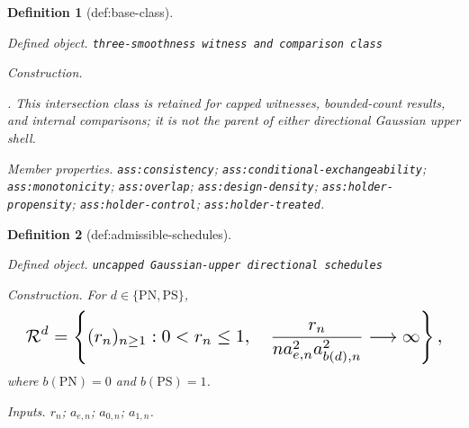 \documentclass{article}
\newtheorem{definition}{Definition}
\begin{document}
\begin{definition}[def:base-class]\label{def:base-class}
\par\smallskip\noindent\emph{Defined object.} \texttt{three-\allowbreak{}smoothness witness and comparison class}
\par\smallskip\noindent\emph{Construction.} \par\noindent {}\par\noindent. This intersection class is retained for capped witnesses, bounded-count results, and internal comparisons; it is not the parent of either directional Gaussian upper shell.
\par\smallskip\noindent\emph{Member properties.} \texttt{ass:\allowbreak{}consistency}; \texttt{ass:\allowbreak{}conditional-\allowbreak{}exchangeability}; \texttt{ass:\allowbreak{}monotonicity}; \texttt{ass:\allowbreak{}overlap}; \texttt{ass:\allowbreak{}design-\allowbreak{}density}; \texttt{ass:\allowbreak{}holder-\allowbreak{}propensity}; \texttt{ass:\allowbreak{}holder-\allowbreak{}control}; \texttt{ass:\allowbreak{}holder-\allowbreak{}treated}.
\end{definition}

\begin{definition}[def:admissible-schedules]\label{def:admissible-schedules}
\par\smallskip\noindent\emph{Defined object.} \texttt{uncapped Gaussian-\allowbreak{}upper directional schedules}
\par\smallskip\noindent\emph{Construction.} For \(d\in\{\mathrm{PN},\mathrm{PS}\}\),
\[
\makebox[\linewidth][c]{\resizebox{0.98\linewidth}{!}{\par\noindent \makebox[\linewidth][c]{\resizebox{0.98\linewidth}{!}{\(\displaystyle \displaystyle \mathcal R^d=\left\{(r_n)_{n\ge1}:0<r_n\le1,\quad\frac{r_n}{na_{e,n}^2a_{b(d),n}^2}\longrightarrow\infty\right\},\)}}\par\noindent}}
\]
where \(b(\mathrm{PN})=0\) and \(b(\mathrm{PS})=1\).
\par\smallskip\noindent\emph{Inputs.} \(r_n\); \(a_{e,n}\); \(a_{0,n}\); \(a_{1,n}\).
\end{definition}
\end{document}
